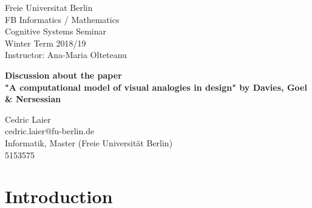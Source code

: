 \documentclass[12pt]{article}
\begin{document}
\noindent
Freie Universitat Berlin\\
FB Informatics / Mathematics\\
Cognitive Systems Seminar\\
Winter Term 2018/19\\
Instructor: Ana-Maria Olteteanu
\vspace{5cm}
\begin{center}
{\LARGE \textbf{Discussion about the paper \\"A computational model of visual analogies in design" by Davies, Goel \& Nersessian}}
\end{center}
\vspace{6,5cm}

\noindent
Cedric Laier \\
cedric.laier@fu-berlin.de\\
Informatik, Master (Freie Universität Berlin) \\
5153575 \\
\clearpage


\section{Introduction}
\end{document}
